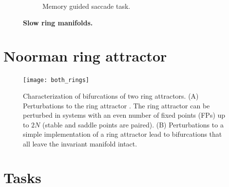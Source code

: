 \documentclass{article}
\newcounter{ct}
\theoremstyle{definition}
\theoremstyle{remark}
\begin{document}
\begin{figure}[htbp]
\begin{subfigure}[b]{0.45\textwidth}
        \caption{Memory guided saccade task.}
    \label{fig:slowcenterout}
    \end{subfigure}
    \caption{\textbf{Slow ring manifolds.}}
    \label{fig:slowmanifolds}
\end{figure}


\newpage
\section{Noorman ring attractor}
\begin{figure}[tbhp]
     \centering
  \texttt{[image: both\_rings]}
       \caption{Characterization of bifurcations of two ring attractors. 
       (A)       Perturbations to the ring attractor \citep{Noorman2022}. The ring attractor can be perturbed in systems with an even number of fixed points (FPs)  up to $2N$ (stable and saddle points are paired). 
       (B) Perturbations to a simple implementation of a ring attractor lead to bifurcations that all leave the invariant manifold intact.
       }
         \label{fig:both_rings}
\end{figure}



\newpage
\section{Tasks}
\end{document}
